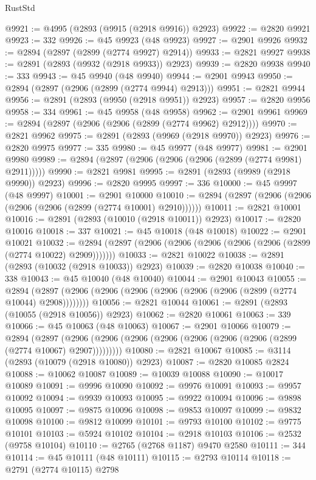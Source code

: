 \begin{lexlean}{RustStd}
\begin{coremodule}
@9921 := @4995 (@2893 (@9915 (@2918 @9916)) @2923)
@9922 := @2820 @9921
@9923 := 332
@9926 := @45 @9923 (@48 @9923)
@9927 := @2901 @9926
@9932 := @2894 (@2897 (@2899 (@2774 @9927) @2914))
@9933 := @2821 @9927
@9938 := @2891 (@2893 (@9932 (@2918 @9933)) @2923)
@9939 := @2820 @9938
@9940 := 333
@9943 := @45 @9940 (@48 @9940)
@9944 := @2901 @9943
@9950 := @2894 (@2897 (@2906 (@2899 (@2774 @9944) @2913)))
@9951 := @2821 @9944
@9956 := @2891 (@2893 (@9950 (@2918 @9951)) @2923)
@9957 := @2820 @9956
@9958 := 334
@9961 := @45 @9958 (@48 @9958)
@9962 := @2901 @9961
@9969 := @2894 (@2897 (@2906 (@2906 (@2899 (@2774 @9962) @2912))))
@9970 := @2821 @9962
@9975 := @2891 (@2893 (@9969 (@2918 @9970)) @2923)
@9976 := @2820 @9975
@9977 := 335
@9980 := @45 @9977 (@48 @9977)
@9981 := @2901 @9980
@9989 := @2894 (@2897 (@2906 (@2906 (@2906 (@2899 (@2774 @9981) @2911)))))
@9990 := @2821 @9981
@9995 := @2891 (@2893 (@9989 (@2918 @9990)) @2923)
@9996 := @2820 @9995
@9997 := 336
@10000 := @45 @9997 (@48 @9997)
@10001 := @2901 @10000
@10010 := @2894 (@2897 (@2906 (@2906 (@2906 (@2906 (@2899 (@2774 @10001) @2910))))))
@10011 := @2821 @10001
@10016 := @2891 (@2893 (@10010 (@2918 @10011)) @2923)
@10017 := @2820 @10016
@10018 := 337
@10021 := @45 @10018 (@48 @10018)
@10022 := @2901 @10021
@10032 := @2894 (@2897 (@2906 (@2906 (@2906 (@2906 (@2906 (@2899 (@2774 @10022) @2909)))))))
@10033 := @2821 @10022
@10038 := @2891 (@2893 (@10032 (@2918 @10033)) @2923)
@10039 := @2820 @10038
@10040 := 338
@10043 := @45 @10040 (@48 @10040)
@10044 := @2901 @10043
@10055 := @2894 (@2897 (@2906 (@2906 (@2906 (@2906 (@2906 (@2906 (@2899 (@2774 @10044) @2908))))))))
@10056 := @2821 @10044
@10061 := @2891 (@2893 (@10055 (@2918 @10056)) @2923)
@10062 := @2820 @10061
@10063 := 339
@10066 := @45 @10063 (@48 @10063)
@10067 := @2901 @10066
@10079 := @2894
    (@2897 (@2906 (@2906 (@2906 (@2906 (@2906 (@2906 (@2906 (@2899 (@2774 @10067) @2907)))))))))
@10080 := @2821 @10067
@10085 := @3114 (@2893 (@10079 (@2918 @10080)) @2923)
@10087 := @2820 @10085 @2824
@10088 := @10062 @10087
@10089 := @10039 @10088
@10090 := @10017 @10089
@10091 := @9996 @10090
@10092 := @9976 @10091
@10093 := @9957 @10092
@10094 := @9939 @10093
@10095 := @9922 @10094
@10096 := @9898 @10095
@10097 := @9875 @10096
@10098 := @9853 @10097
@10099 := @9832 @10098
@10100 := @9812 @10099
@10101 := @9793 @10100
@10102 := @9775 @10101
@10103 := @5924 @10102
@10104 := @2918 @10103
@10106 := @2532 (@9758 @10104)
@10110 := @2765 (@2768 @1187) @9470 @2580
@10111 := 344
@10114 := @45 @10111 (@48 @10111)
@10115 := @2793 @10114
@10118 := @2791 (@2774 @10115) @2798

\end{coremodule}
\end{lexlean}
